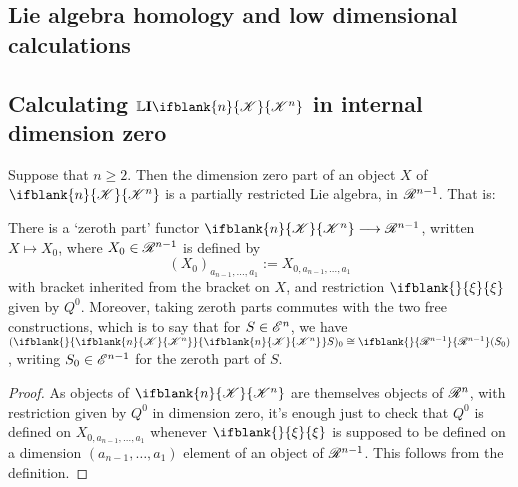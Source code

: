 \documentclass[10pt]{article}
\newcommand{\GS}[1]{\scrE^{#1}}
\newcommand{\PRLie}[1]{\scrR^{#1}}%
\newcommand{\LL}[1]{\ifblank{#1}{\scrK}{\scrK^{#1}}}
\newcommand{\Ind}[2][]{\mathbf{I}{#2}_{#1}}%
\newcommand{\Fr}[2][]{\ifblank{#1}{#2}{#2_{#1}}}
\newcommand{\restn}[2][]{\ifblank{#1}{\xi{#2}}{\xi_{#1}{#2}}}%
\newcommand{\derived}{\mathbb{L}}
\renewcommand{\Q}{Q}
\begin{document}
\begin{DerivedFunctorsLowDimension}
\section{Lie algebra homology and low dimensional calculations}
\subsection{Calculating $\derived\Ind{\LL{n}}$ in internal dimension zero}
Suppose that $n\geq2$. Then the dimension zero part of an object $X$ of $\LL{n}$ is a partially restricted Lie algebra, in $\PRLie{n-1}$. That is: 
\begin{lem}
There is a `zeroth part' functor $\LL{n}\to\PRLie{n-1}$, written $X\mapsto X_0$, where $X_0\in\PRLie{n-1}$ is defined by
\[(X_0)_{a_{n-1},\ldots,a_1}:=X_{0,a_{n-1},\ldots,a_1}\]
with bracket inherited from the bracket on $X$, and restriction $\restn{}$ given by $\Q^0$. Moreover, taking zeroth parts commutes with the two free constructions, which is to say that for $S\in\GS{n}$, we have $(\Fr{\LL{n}}S)_0\cong\Fr{\PRLie{n-1}}(S_0)$, writing $S_0\in\GS{n-1}$ for the zeroth part of $S$.
\end{lem}
\begin{proof}
As objects of $\LL{n}$ are themselves objects of $\PRLie{n}$, with restriction given by $\Q^0$ in dimension zero, it's enough just to check that $\Q^0$ is defined on $X_{0,a_{n-1},\ldots,a_1}$ whenever $\restn{}$ is supposed to be defined on a dimension $(a_{n-1},\ldots,a_1)$ element of an object of $\PRLie{n-1}$. This follows from the definition.


\end{proof}
\end{DerivedFunctorsLowDimension}
\end{document}
